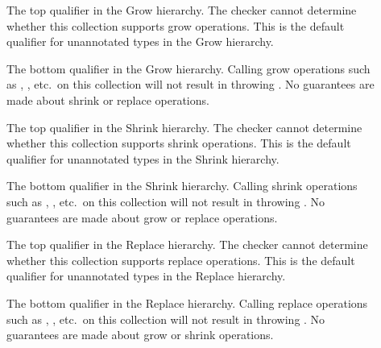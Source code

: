 
\begin{description}

\item[]
The top qualifier in the Grow hierarchy.
The checker cannot determine whether this collection supports grow
operations.  This is the default qualifier for unannotated types in the
Grow hierarchy.

\item[]
The bottom qualifier in the Grow hierarchy.
Calling grow operations such as , , etc.\ on this
collection will not result in throwing .
No guarantees are made about shrink or replace operations.

\item[]
The top qualifier in the Shrink hierarchy.
The checker cannot determine whether this collection supports shrink
operations.  This is the default qualifier for unannotated types in the
Shrink hierarchy.

\item[]
The bottom qualifier in the Shrink hierarchy.
Calling shrink operations such as , , etc.\ on
this collection will not result in throwing
.
No guarantees are made about grow or replace operations.

\item[]
The top qualifier in the Replace hierarchy.
The checker cannot determine whether this collection supports replace
operations.  This is the default qualifier for unannotated types in the
Replace hierarchy.

\item[]
The bottom qualifier in the Replace hierarchy.
Calling replace operations such as , , etc.\
on this collection will not result in throwing
.
No guarantees are made about grow or shrink operations.

\end{description}


